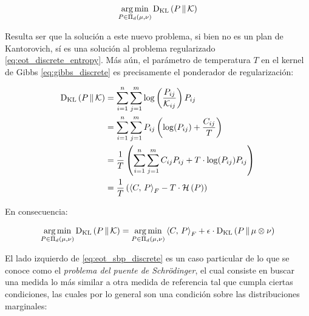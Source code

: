 \begin{equation*}
	\operatorname*{arg\,min}_{P\in\Pi_d(\mu,\nu)} \operatorname{D_{KL}}\left(P\,\|\,\mathcal{K}\right)
\end{equation*}

Resulta ser que la solución a este nuevo problema, si bien no es un plan de Kantorovich, sí es una solución al problema regularizado \eqref{eq:eot_discrete_entropy}. Más aún, el parámetro de temperatura $T$ en el kernel de Gibbs \eqref{eq:gibbs_discrete} es precisamente el ponderador de regularización:

\begin{align*}
	\operatorname{D_{KL}}\left(P\,\|\,\mathcal{K}\right) &= \sum_{i=1}^n\sum_{j=1}^m \log\left(\frac{P_{ij}}{\mathcal{K}_{ij}}\right) P_{ij}\\
	&= \sum_{i=1}^n\sum_{j=1}^m P_{ij}\left(\log(P_{ij}) + \frac{C_{ij}}{T}\right)\\
	&= \frac{1}{T}\left(\sum_{i=1}^n\sum_{j=1}^m C_{ij}P_{ij} + T\cdot\log(P_{ij})P_{ij}\right)\\
	&= \frac{1}{T}\left(\left\langle C,\,P\right\rangle_F - T\cdot\mathcal{H}\left(P\right)\right)
\end{align*}

En consecuencia:

\begin{equation}
	\label{eq:eot_sbp_discrete}
	\operatorname*{arg\,min}_{P\in\Pi_d(\mu,\nu)} \operatorname{D_{KL}}\left(P\,\|\,\mathcal{K}\right)
	= \operatorname*{arg\,min}_{P\in\Pi_d(\mu,\nu)} \left\langle C,\,P\right\rangle_F + \epsilon \cdot\operatorname{D_{KL}}\left(P\,\|\,\mu\otimes\nu\right)
\end{equation}

El lado izquierdo de \eqref{eq:eot_sbp_discrete} es un caso particular de lo que se conoce como el \textit{problema del puente de Schrödinger}, el cual consiste en buscar una medida lo más similar a otra medida de referencia tal que cumpla ciertas condiciones, las cuales por lo general son una condición sobre las distribuciones marginales:


